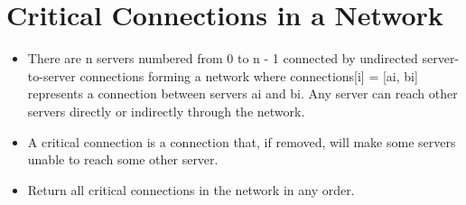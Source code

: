 \documentclass[9pt, b5paaper]{book}
\begin{document}
\section{Critical Connections in a Network}
\label{sec-22-5}
\begin{itemize}
\item There are n servers numbered from 0 to n - 1 connected by undirected server-to-server connections forming a network where connections[i] = [ai, bi] represents a connection between servers ai and bi. Any server can reach other servers directly or indirectly through the network.
\item A critical connection is a connection that, if removed, will make some servers unable to reach some other server.
\item Return all critical connections in the network in any order.
\end{itemize}
\end{document}
